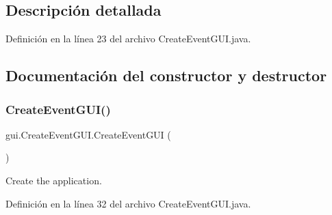 \subsection{Descripción detallada}


Definición en la línea 23 del archivo Create\+Event\+G\+U\+I.\+java.



\subsection{Documentación del constructor y destructor}
\mbox{\label{classgui_1_1CreateEventGUI_afd301ba60a1dd47e03527110c3017274}} 
\subsubsection{\texorpdfstring{CreateEventGUI()}{CreateEventGUI()}}
{\footnotesize\ttfamily gui.\+Create\+Event\+G\+U\+I.\+Create\+Event\+G\+UI (\begin{DoxyParamCaption}{ }\end{DoxyParamCaption})}

Create the application. 

Definición en la línea 32 del archivo Create\+Event\+G\+U\+I.\+java.


